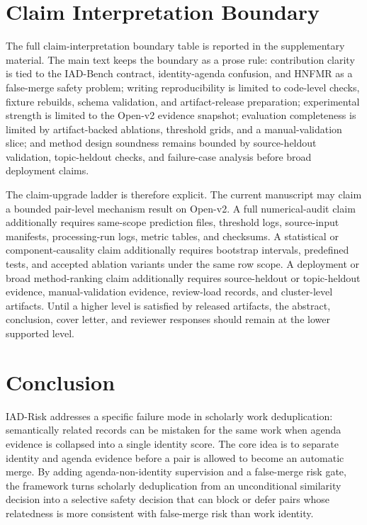 \documentclass[11pt]{article}
\begin{document}
\section{Claim Interpretation Boundary}

The full claim-interpretation boundary table is reported in the supplementary material. The main text keeps the boundary as a prose rule: contribution clarity is tied to the IAD-Bench contract, identity-agenda confusion, and HNFMR as a false-merge safety problem; writing reproducibility is limited to code-level checks, fixture rebuilds, schema validation, and artifact-release preparation; experimental strength is limited to the Open-v2 evidence snapshot; evaluation completeness is limited by artifact-backed ablations, threshold grids, and a manual-validation slice; and method design soundness remains bounded by source-heldout validation, topic-heldout checks, and failure-case analysis before broad deployment claims.

The claim-upgrade ladder is therefore explicit. The current manuscript may claim a bounded pair-level mechanism result on Open-v2. A full numerical-audit claim additionally requires same-scope prediction files, threshold logs, source-input manifests, processing-run logs, metric tables, and checksums. A statistical or component-causality claim additionally requires bootstrap intervals, predefined tests, and accepted ablation variants under the same row scope. A deployment or broad method-ranking claim additionally requires source-heldout or topic-heldout evidence, manual-validation evidence, review-load records, and cluster-level artifacts. Until a higher level is satisfied by released artifacts, the abstract, conclusion, cover letter, and reviewer responses should remain at the lower supported level.

\section{Conclusion}

IAD-Risk addresses a specific failure mode in scholarly work deduplication: semantically related records can be mistaken for the same work when agenda evidence is collapsed into a single identity score. The core idea is to separate identity and agenda evidence before a pair is allowed to become an automatic merge. By adding agenda-non-identity supervision and a false-merge risk gate, the framework turns scholarly deduplication from an unconditional similarity decision into a selective safety decision that can block or defer pairs whose relatedness is more consistent with false-merge risk than work identity.
\end{document}
